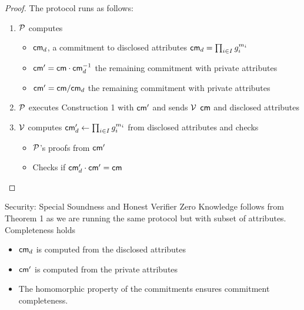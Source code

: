 {\begin{proof}
   The protocol runs as follows:
    \begin{enumerate}
        \item $\mathcal{P}$ computes
            \begin{itemize}
                \item  $\mathsf{cm}_d$, a commitment to disclosed attributes $\mathsf{cm}_d = \prod_{i \in I}g_i^{m_i}$
                \item $\mathsf{cm}' = \mathsf{cm} \cdot \mathsf{cm}_d^{-1}$ the remaining commitment with private attributes
                \item $\mathsf{cm}' = \mathsf{cm} / \mathsf{cm}_d$ the remaining commitment with private attributes
            \end{itemize}
        \item $\mathcal{P}$ executes Construction 1 with $\mathsf{cm}'$ and sends $\mathcal{V}$ $\mathsf{cm}$ and disclosed attributes 
        \item $\mathcal{V}$ computes $\mathsf{cm}_d' \gets \prod_{i \in I}g_i^{m_i}$ from disclosed attributes and checks
        \begin{itemize}
            \item $\mathcal{P}$'s proofs from $\mathsf{cm}'$
            \item  Checks if $\mathsf{cm}_d' \cdot \mathsf{cm}' = \mathsf{cm}$
        \end{itemize}
    \end{enumerate}
\end{proof}

\noindent Security: Special Soundness and Honest Verifier Zero Knowledge follows from Theorem 1 as we are running the same protocol but with subset of attributes. Completeness holds 
\begin{itemize}
    \item $\mathsf{cm}_d$ is computed from the disclosed attributes
    \item $\mathsf{cm}'$ is computed from the private attributes
    \item The homomorphic property of the commitments ensures commitment completeness.
\end{itemize}


% 
% 

















}
